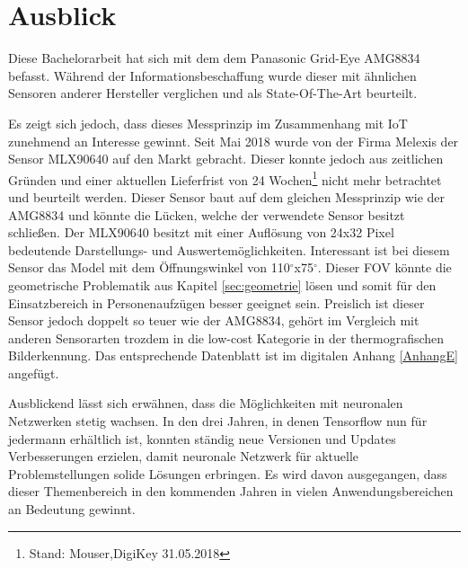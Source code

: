 \newpage
\section{Ausblick}
\label{sec:Ausblick}
Diese Bachelorarbeit hat sich mit dem dem Panasonic Grid-Eye AMG8834 befasst. Während der Informationsbeschaffung wurde dieser mit ähnlichen Sensoren anderer Hersteller verglichen und als State-Of-The-Art beurteilt. 

Es zeigt sich jedoch, dass dieses Messprinzip im Zusammenhang mit \ac{IoT} zunehmend an Interesse gewinnt.  Seit Mai 2018 wurde von der Firma Melexis der Sensor MLX90640 auf den Markt gebracht. Dieser konnte jedoch aus zeitlichen Gründen und einer aktuellen Lieferfrist von 24 Wochen\footnote[34]{Stand: Mouser,DigiKey 31.05.2018 } nicht mehr betrachtet und beurteilt werden.
Dieser Sensor baut auf dem gleichen Messprinzip wie der AMG8834 und könnte die Lücken, welche der verwendete Sensor besitzt schließen. Der MLX90640 besitzt mit einer Auflösung von 24x32 Pixel bedeutende Darstellungs- und Auswertemöglichkeiten. Interessant ist bei diesem Sensor das Model mit dem Öffnungswinkel von 110$^\circ$x75$^\circ$. Dieser \ac{FOV} könnte die geometrische Problematik aus Kapitel \ref{sec:geometrie} lösen und somit für den Einsatzbereich in Personenaufzügen besser geeignet sein. Preislich ist dieser Sensor jedoch doppelt so teuer wie der AMG8834, gehört im Vergleich mit anderen Sensorarten trozdem in die low-cost Kategorie in der thermografischen Bilderkennung. Das entsprechende Datenblatt ist im digitalen Anhang \ref{AnhangE} angefügt.

Ausblickend lässt sich erwähnen, dass die Möglichkeiten mit neuronalen Netzwerken stetig wachsen. In den drei Jahren, in denen Tensorflow nun für jedermann erhältlich ist, konnten ständig neue Versionen und Updates Verbesserungen erzielen, damit neuronale Netzwerk für aktuelle Problemstellungen solide Lösungen erbringen. Es wird davon ausgegangen, dass dieser Themenbereich in den kommenden Jahren in vielen Anwendungsbereichen an Bedeutung gewinnt.